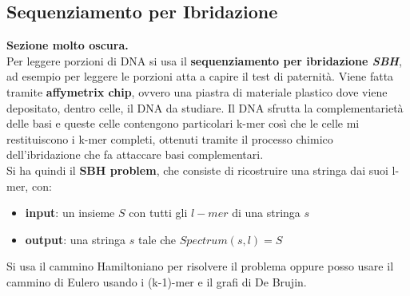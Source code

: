 \documentclass[a4paper,12pt, oneside]{book}
\begin{document}
\subsection{Sequenziamento per Ibridazione}
\textbf{Sezione molto oscura.}\\
Per leggere porzioni di DNA si usa il \textbf{sequenziamento per ibridazione
  \textit{SBH}}, ad esempio per leggere le porzioni atta a capire il test di
paternità. Viene fatta tramite \textbf{affymetrix chip}, ovvero una piastra di
materiale plastico dove viene depositato, dentro celle, il DNA da studiare. Il
DNA sfrutta la complementarietà delle basi e queste celle contengono particolari
k-mer così che le celle mi restituiscono i k-mer completi, ottenuti tramite il
processo chimico dell'ibridazione che fa attaccare basi complementari.\\

Si ha quindi il \textbf{SBH problem}, che consiste di ricostruire una stringa
dai suoi l-mer, con:
\begin{itemize}
  \item \textbf{input}: un insieme $S$ con tutti gli $l-mer$ di una stringa $s$
  \item \textbf{output}: una stringa $s$ tale che $Spectrum(s,l)=S$
\end{itemize}
Si usa il cammino Hamiltoniano per risolvere il problema oppure posso usare il
cammino di Eulero usando i (k-1)-mer e il grafi di De Brujin.
\end{document}
